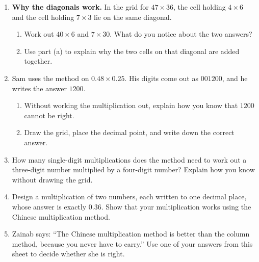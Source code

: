 \documentclass[12pt,a4paper]{article}
\begin{document}
\begin{enumerate}[resume]

\item \textbf{Why the diagonals work.} In the grid for $47\times36$, the cell
holding $4\times6$ and the cell holding $7\times3$ lie on the same diagonal.
\begin{enumerate}
  \item Work out $40\times6$ and $7\times30$. What do you notice about the two
        answers?

        \vspace{6.5em}
  \item Use part (a) to explain why the two cells on that diagonal are added
        together.

        \vspace{7.5em}
\end{enumerate}

\item Sam uses the method on $0.48\times0.25$. His digits come out as
$001200$, and he writes the answer $1200$.
\begin{enumerate}
  \item Without working the multiplication out, explain how you know that
        $1200$ cannot be right.

        \vspace{5.5em}
  \item Draw the grid, place the decimal point, and write down the correct
        answer.

        \vspace{14em}
\end{enumerate}

\newpage

\item How many single-digit multiplications does the method need to work out a
three-digit number multiplied by a four-digit number? Explain how you know
without drawing the grid.

\vspace{9em}

\item Design a multiplication of two numbers, each written to one decimal
place, whose answer is exactly $0.36$. Show that your multiplication works
using the Chinese multiplication method.

\vspace{18em}

\item Zainab says: ``The Chinese multiplication method is better than the
column method, because you never have to carry.'' Use one of your answers from
this sheet to decide whether she is right.

\vspace{13em}

\end{enumerate}
\end{document}
